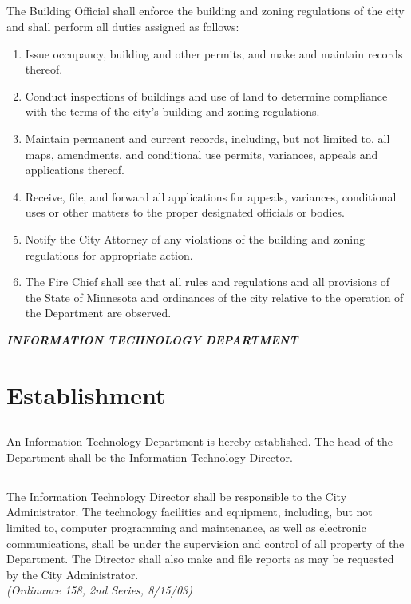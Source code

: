 \subsection{}
The Building Official shall enforce the building and zoning regulations of the city and shall perform all duties assigned as follows:
\begin{enumerate}
    \item Issue occupancy, building and other permits, and make and maintain records thereof.
    \item Conduct inspections of buildings and use of land to determine compliance with the terms of the city’s building and zoning regulations.
    \item Maintain permanent and current records, including, but not limited to, all maps, amendments, and conditional use permits, variances, appeals and applications thereof.
    \item Receive, file, and forward all applications for appeals, variances, conditional uses or other matters to the proper designated officials or bodies.
    \item Notify the City Attorney of any violations of the building and zoning regulations for appropriate action.
    \item The Fire Chief shall see that all rules and regulations and all provisions of the State of Minnesota and ordinances of the city relative to the operation of the Department are observed.
\end{enumerate}

\centerline{\textbf{\emph{\LARGE{INFORMATION TECHNOLOGY DEPARTMENT}}}}
\setcounter{section}{49}
\section{Establishment}
\subsection{}
An Information Technology Department is hereby established. The head of the Department shall be the Information Technology Director.
\subsection{}
The Information Technology Director shall be responsible to the City Administrator. The technology facilities and equipment, including, but not limited to, computer programming and maintenance, as well as electronic communications, shall be under the supervision and control of all property of the Department. The Director shall also make and file reports as may be requested by the City Administrator.\\
\emph{(Ordinance 158, 2nd Series, 8/15/03)}\\


